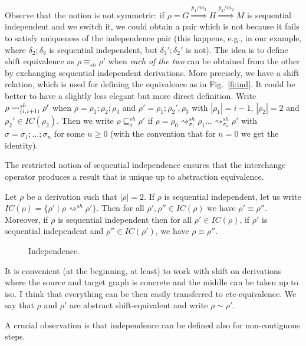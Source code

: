 \documentclass{llncs}
\newcommand{\Rrel}[1]   {\stackrel{{#1}}{\Longrightarrow}}
\newcommand{\perm}{\sigma}
\newcommand{\shiftdir}[1][]{\ensuremath{\mathrel{{\rightsquigarrow}^{\mathit{sh}}_{#1}}}}
\newcommand{\shiftpre}[1][]{\ensuremath{\mathrel{{\sqsubseteq}^{\mathit{sh}}_{#1}}}}
\newcommand{\IC}[1]{\ensuremath{\mathit{IC}({#1})}}
\begin{document}
Observe that the notion is not symmetric: if
$\rho = G \Rrel{p_1/m_1} H \Rrel{p_2/m_2} M$ is sequential independent
and we switch it, we could obtain a pair which is not because it fails
to satisfy uniqueness of the independence pair (this happens, e.g., in
our example, where $\delta_2;\delta_3$ is sequential independent, but
$\delta_3';\delta_2'$ is not). The idea is to define shift equivalence
as $\rho \equiv_{sh} \rho'$ when \emph{each of the two} can be
obtained from the other by exchanging sequential independent
derivations. More precisely, we have a shift relation, which is used
for defining the equivalence as in Fig.~\ref{fi:ind}. It could be
better to have a slightly less elegant but more direct
definition. Write $\rho \shiftdir[\transp{i}] \rho'$ when
$\rho = \rho_1; \rho_2; \rho_3$ and $\rho' = \rho_1; \rho_2', \rho_3$
with $|\rho_1| = i-1$, $|\rho_2|=2$ and $\rho_2' \in
\IC{\rho_2}$. Then we write $\rho \shiftpre[\perm] \rho'$ if
$\rho = \rho_0 \shiftdir[\perm_1] \rho_1 \ldots \shiftdir[\perm_n ]
\rho'$ with $\perm = \perm_1; \ldots; \perm_n$ for some $n \geq 0$
(with the convention that for $n=0$ we get the identity).

The restricted notion of sequential independence ensures that the interchange operator produces a result that is unique up to abstraction equivalence.

\begin{lemma}[IC is unique]
  \label{le:unique-IC} 
  Let $\rho$ be a derivation such that $|\rho|=2$. If $\rho$ is
  sequential independent, let us write
  $\IC{\rho} = \{ \rho' \mid \rho \shiftdir \rho'\}$. Then for
  all $\rho', \rho'' \in \IC{\rho}$ we have $\rho' \equiv
  \rho''$. Moreover, if $\rho$ is sequential independent then for all
  $\rho' \in \IC{\rho}$, if $\rho'$ is sequential independent and
  $\rho'' \in \IC{\rho'}$, we have $\rho \equiv \rho''$.
\end{lemma}


\begin{figure}[t]
  
  \caption{Independence.}
  \label{fi:independence}
\end{figure}

It is convenient (at the beginning, at least) to work with shift
on derivations where the source and target graph is concrete and the
middle can be taken up to iso. I think that everything can be then
easily transferred to ctc-equivalence. We say that $\rho$ and $\rho'$
are abstract shift-equivalent and write $\rho \sim \rho'$.

A crucial observation is that independence can be defined also for non-contiguous steps.
\end{document}
